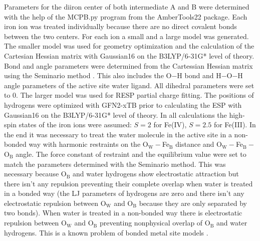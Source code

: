 Parameters for the diiron center of both intermediate A and B were determined with the help of the MCPB.py \cite{Li2016} program from the AmberTools22 package. Each iron ion was treated individually because there are no direct covalent bonds between the two centers. For each ion a small and a large model was generated. The smaller model was used for geometry optimization and the calculation of the Cartesian Hessian matrix with Gaussian16 on the B3LYP/6-31G* level of theory. Bond and angle parameters were determined from the Cartessian Hessian matrix using the Seminario method \cite{seminario1996}. This also includes the O$-$H bond and H$-$O$-$H angle parameters of the active site water ligand. All dihedral parameters were set to 0. The larger model was used for RESP partial charge fitting. The positions of hydrogens were optimized with GFN2-xTB prior to calculating the ESP with Gaussian16 on the B3LYP/6-31G* level of theory. In all calculations the high-spin states of the iron ions were assumed: $S=2$ for Fe(IV), $S=2.5$ for Fe(III). In the end it was necessary to treat the water molecule in the active site in a non-bonded way with harmonic restraints on the O$_\text{W}-$Fe$_\text{B}$ distance and O$_\text{W}-$Fe$_\text{B}-$O$_\text{B}$ angle. The force constant of restraint and the equilibrium value were set to match the parameters determined with the Seminario method. This was necessary because O$_\text{B}$ and water hydrogens show electrostatic attraction but there isn't any repulsion preventing their complete overlap when water is treated in a bonded way (the LJ parameters of hydrogens are zero and there isn't any electrostatic repulsion between O$_\text{W}$ and O$_\text{B}$ because they are only separated by two bonds). When water is treated in a non-bonded way there is electrostatic repulsion between O$_\text{W}$ and O$_\text{B}$ preventing nonphysical overlap of O$_\text{B}$ and water hydrogens. This is a known problem of bonded metal site models \cite{Li2017}.

